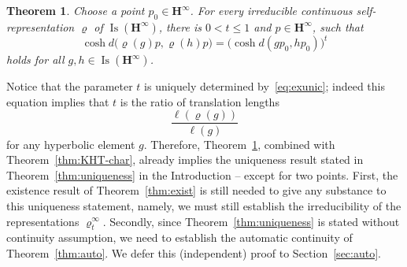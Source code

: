 \documentclass[11pt]{article}
\newtheorem{theorem}[theo]{Theorem}
\theoremstyle{definition}
\numberwithin{equation}{section}
\numberwithin{figure}{section}
\numberwithin{table}{section}
\newcommand{\HHI}{\mathbf{H}^{\infty}}
\newcommand{\Isomi}{{\Isom}(\HHI)}
\DeclareMathOperator{\Isom}{Is}
\newcommand{\ro}{\varrho}
\begin{document}
\begin{theorem}\label{thm:exunic}
Choose a point $p_0\in \HHI$. For every irreducible continuous self-representation $\ro$ of $\Isomi$, there is $0<t\leq 1$ and $p\in \HHI$, such that
\begin{equation}\label{eq:exunic}
\cosh d\big(\ro(g) p, \ro(h) p\big) = \big(\cosh d(g p_0, h p_0)\big)^t
\end{equation}
holds for all $g,h\in \Isomi$.
\end{theorem}

Notice that the parameter $t$ is uniquely determined by~\eqref{eq:exunic}; indeed this equation implies that $t$ is the ratio of translation lengths
\[
\frac{\ell(\ro(g))}{\ell(g)}
\]
for any hyperbolic element $g$. Therefore, Theorem~\ref{thm:exunic}, combined with Theorem~\ref{thm:KHT-char}, already implies the uniqueness result stated in Theorem~\ref{thm:uniqueness} in the Introduction -- except for two points. First, the existence result of Theorem~\ref{thm:exist} is still needed to give any substance to this uniqueness statement, namely, we must still establish the irreducibility of the representations $\ro^\infty_t$. Secondly, since Theorem~\ref{thm:uniqueness} is stated without continuity assumption, we need to establish the automatic continuity of Theorem~\ref{thm:auto}. We defer this (independent) proof to Section~\ref{sec:auto}.
\end{document}
